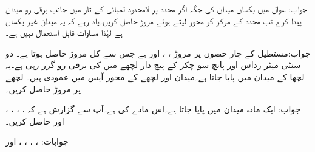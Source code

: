 جواب:
سوال  میں یکساں میدان کی جگہ اگر  محدد پر لامحدود لمبائی کے تار میں  جانب  برقی رو میدان پیدا کرے تب محدد کے مرکز  کو محور لیتے ہوئے مروڑ حاصل کریں۔یاد رہے کہ یہ میدان غیر یکساں ہے لہٰذا مساوات   قابل استعمال نہیں ہے۔

جواب:مستطیل کے چار حصوں پر مروڑ ، ،  اور   ہے جس سے کل مروڑ   حاصل ہوتا ہے۔
دو سنٹی میٹر رداس اور پانچ سو چکر کے پیچ دار لچھے میں  کی برقی رو گزر رہی ہے۔یہ لچھا  کے میدان میں پایا جاتا ہے۔میدان اور لچھے کے محور آپس میں عمودی ہیں۔ لچھے پر مروڑ حاصل کریں۔

جواب:
ایک مادہ  میدان میں پایا جاتا ہے۔اس مادے کی  ہے۔آپ سے گزارش ہے کہ ، ، ،  ، اور  حاصل کریں۔

جوابات: ، ، ، ،  اور 
